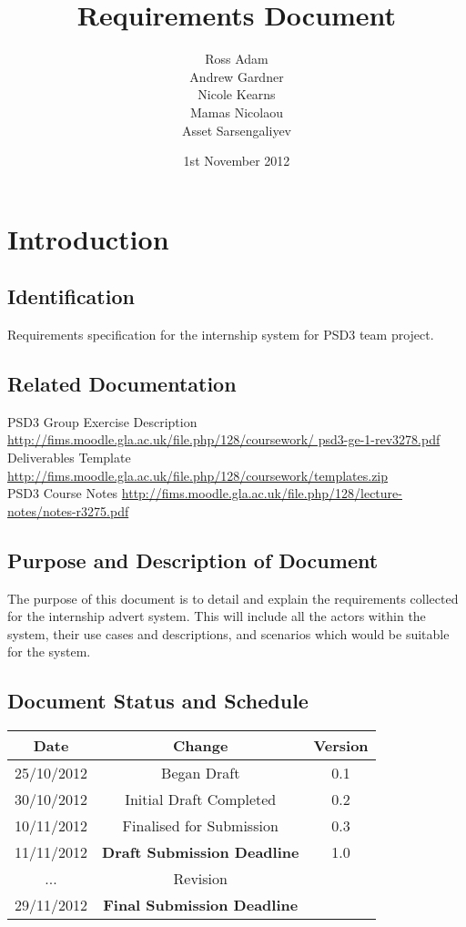 \documentclass{l3deliverable}
\title{Requirements Document}
\author{Ross Adam\\
Andrew Gardner\\
Nicole Kearns\\
Mamas Nicolaou\\
Asset Sarsengaliyev\\
}
\date{1st November 2012}
\begin{document}
\maketitle
\tableofcontents
\newpage
\section{Introduction}
\subsection{Identification}
Requirements specification for the internship system for PSD3 team project.
\subsection{Related Documentation}
PSD3 Group Exercise Description \url{http://fims.moodle.gla.ac.uk/file.php/128/coursework/
psd3-ge-1-rev3278.pdf}\\
Deliverables Template \url{http://fims.moodle.gla.ac.uk/file.php/128/coursework/templates.zip}\\
PSD3 Course Notes \url{http://fims.moodle.gla.ac.uk/file.php/128/lecture-notes/notes-r3275.pdf}
\\
\subsection{Purpose and Description of Document}
The purpose of this document is to detail and explain the requirements collected for the
internship advert system. This will include all the actors within the system, their use cases and
descriptions, and scenarios which would be suitable for the system.
\subsection{Document Status and Schedule}
\begin{center}{
\begin{tabular}{|c|c|c|}
\hline \textbf{Date} &\textbf{ Change} & \textbf{Version}\\ 
\hline 25/10/2012 & Began Draft & 0.1 \\ 
\hline 30/10/2012 & Initial Draft Completed & 0.2\\ 
\hline 10/11/2012 & Finalised for Submission & 0.3\\ 
\hline 11/11/2012 & \textbf{Draft Submission Deadline} & 1.0 \\ 
\hline ... & Revision &\\ 
\hline 29/11/2012 & \textbf{Final Submission Deadline} & \\ 
\hline 
\end{tabular} }
\end{center}
\end{document}
